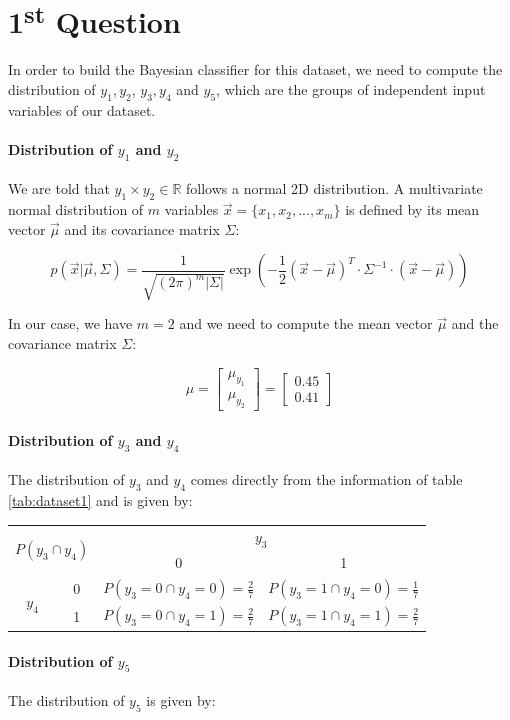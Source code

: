 \documentclass{article}
\begin{document}
\section*{1\textsuperscript{st} Question}

In order to build the Bayesian classifier for this dataset, we need to compute the distribution of ${y_1,y_2}$, ${y_3,y_4}$ and $y_5$, which are the groups of independent input variables of our dataset.

\paragraph{Distribution of $y_1$ and $y_2$}

We are told that $y_1 \times y_2 \in \mathbb{R}$ follows a normal 2D distribution.
A multivariate normal distribution of $m$ variables $\vec{x} = \{x_1, x_2, ..., x_m\}$ is defined by its mean vector $\vec{\mu}$ and its covariance matrix $\Sigma$:

\[
  p(\vec{x}| \vec{\mu}, \Sigma) = \frac{1}{\sqrt{(2\pi)^m |\Sigma|}} \exp \left( -\frac{1}{2} (\vec{x} - \vec{\mu})^T \cdot \Sigma^{-1} \cdot (\vec{x} - \vec{\mu}) \right)
  \]

In our case, we have $m = 2$ and we need to compute the mean vector $\vec{\mu}$ and the covariance matrix $\Sigma$:

\[ \mu = \begin{bmatrix} \mu_{y_1} \\ \mu_{y_2} \end{bmatrix} = \begin{bmatrix} 0.45 \\ 0.41 \end{bmatrix} 
  \]



\paragraph{Distribution of $y_3$ and $y_4$}

The distribution of $y_3$ and $y_4$ comes directly from the information of table \ref{tab:dataset1} and is given by:

\begin{table}[h!]
\centering
\begin{tabular}{|cc|cc|}
\hline
\multicolumn{2}{|c|}{\multirow{2}{*}{$P(y_3 \cap y_4)$}} & \multicolumn{2}{c|}{$y_3$}                     \\ \cline{3-4} 
\multicolumn{2}{|c|}{}                                   & \multicolumn{1}{c|}{0}           & 1           \\ \hline
\multicolumn{1}{|c|}{\multirow{2}{*}{$y_4$}}     & 0     & \multicolumn{1}{c|}{$P(y_3=0 \cap y_4=0) =\frac{2}{7}$} & $P(y_3=1 \cap y_4=0) =\frac{1}{7}$ \\ \cline{2-4} 
\multicolumn{1}{|c|}{}                           & 1     & \multicolumn{1}{c|}{$P(y_3=0 \cap y_4=1) =\frac{2}{7}$} & $P(y_3=1 \cap y_4=1) =\frac{2}{7}$ \\ \hline
\end{tabular}
\end{table}

\paragraph{Distribution of $y_5$}

The distribution of $y_5$ is given by:
\end{document}
